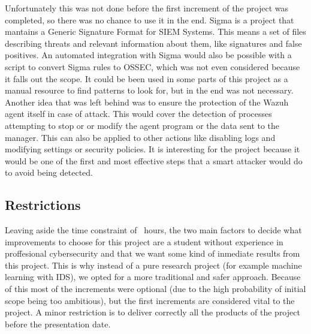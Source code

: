 Unfortunately this was not done before the first increment of the project was completed, so there was no chance to use it in the end.
\linej
\linej
Sigma\cite{sigma} is a project that mantains a Generic Signature Format for SIEM Systems. This means a set of files describing threats and relevant information about them, like signatures and false positives. An automated integration with Sigma would also be possible with a script to convert Sigma rules to OSSEC, which was not even considered because it falls out the scope. It could be been used in some parts of this project as a manual resource to find patterns to look for, but in the end was not necessary.
\linej
\linej
Another idea that was left behind was to ensure the protection of the Wazuh agent itself in case of attack. This would cover the detection of processes attempting to stop or or modify the agent program or the data sent to the manager. This can also be applied to other actions like disabling logs and modifying settings or security policies. It is interesting for the project because it would be one of the first and most effective steps that a smart attacker would do to avoid being detected.

\subsection{Restrictions}
Leaving aside the time constraint of \projecthours \ hours, the two main factors to decide what improvements to choose for this project are a student without experience in proffesional cybersecurity and that we want some kind of inmediate results from this project.
This is why instead of a pure research project (for example machine learning with IDS), we opted for a more traditional and safer approach.
Because of this most of the increments were optional (due to the high probability of initial scope being too ambitious), but the first increments are considered vital to the project.
\linej
\linej
A minor restriction is to deliver correctly all the products of the project before the presentation date.

